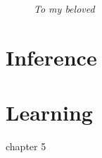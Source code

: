 \documentclass[g5paper,phd,electronic]{kthesis}
\begin{document}
\frontmatter
\maketitle
\thispagestyle{empty}
\vfill
\begin{figure}
\begin{flushright}
\Large
\textit{To my beloved}
\end{flushright}
\end{figure}
\vfill







\tableofcontents


\mainmatter





\part{Inference}
\label{part:inference}





\part{Learning}
\label{part:learning}
chapter 5


% 

% 

% 




\end{document}
